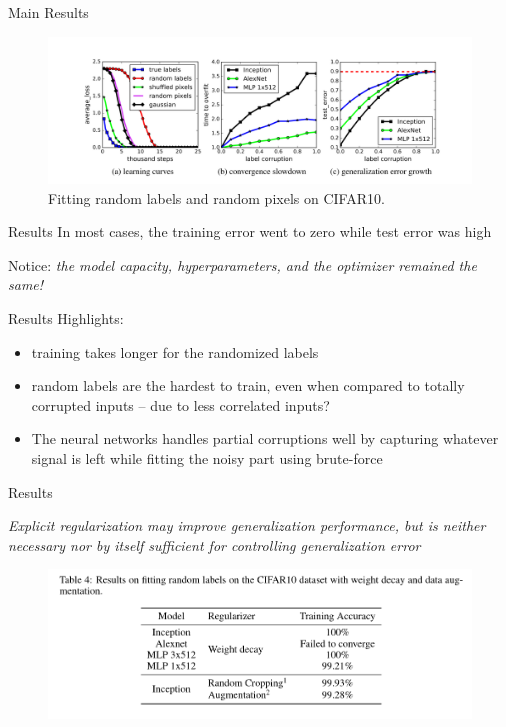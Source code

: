 \documentclass[10pt]{beamer}
\begin{document}
\begin{frame}{Main Results}
		\begin{figure}
			\centering
		\centering
		\includegraphics[width=\linewidth]{fig1c}
		\caption{Fitting random labels and random pixels on CIFAR10.}
		\label{fig:corruptlabels}
		\end{figure}
\end{frame}

\begin{frame}{Results}
	In most cases, the training error went to zero while test error was high
	
	\begin{alertblock}{Notice:}
		\emph{the model capacity, hyperparameters, and the optimizer remained the same!}
	\end{alertblock}

\end{frame}

\begin{frame}{Results}
	Highlights:
	\begin{itemize}
		\item training takes longer for the randomized labels
		\item random labels are the hardest to train, even when compared to totally corrupted inputs -- due to less correlated inputs?
		\item The neural networks handles partial corruptions well by capturing whatever signal is left while fitting the noisy part using brute-force
	\end{itemize}
	
\end{frame}

\begin{frame}{Results}
	\begin{center}
			\emph{Explicit regularization may improve generalization performance, but is neither necessary nor by itself sufficient for controlling generalization error}
	\end{center}

	\begin{figure}
		\centering
		\centering
		\includegraphics[width=\linewidth]{fig2c}
		\label{fig:withreg}
	\end{figure}
\end{frame}
\end{document}
